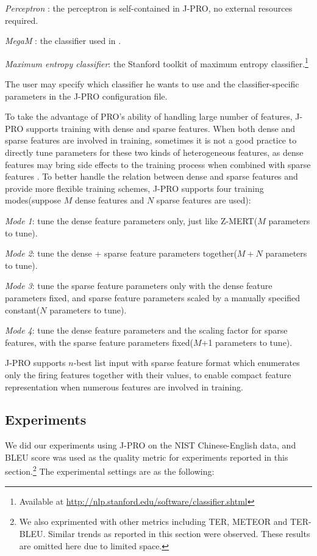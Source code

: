 \documentclass[11pt]{article}
\begin{document}
 \emph{Perceptron} \cite{Rosenblatt1958}: the perceptron is self-contained in J-PRO, no external resources required.

 \emph{MegaM} \cite{Hal2004}: the classifier used in \cite{Hopkins2011}.

 \emph{Maximum entropy classifier}: the Stanford toolkit of maximum entropy classifier.\footnote{Available at \url{http://nlp.stanford.edu/software/classifier.shtml}}
  
The user may specify which classifier he wants to use and the classifier-specific parameters in the J-PRO configuration file.

To take the advantage of PRO's ability of handling large number of features, J-PRO supports training with dense and sparse features. When both dense and sparse features are involved in training, sometimes it is not a good practice to directly tune parameters for these two kinds of heterogeneous features, as dense features may bring side effects to the training process when combined with sparse features \cite{Kristy2008}. To better handle the relation between dense and sparse features and provide more flexible training schemes, J-PRO supports four training modes(suppose $M$ dense features and $N$ sparse features are used):

\emph{Mode 1}: tune the dense feature parameters only, just like Z-MERT($M$ parameters to tune).

\emph{Mode 2}: tune the dense + sparse feature parameters together($M+N$ parameters to tune).

\emph{Mode 3}: tune the sparse feature parameters only with the dense feature parameters fixed, and sparse feature parameters scaled by a manually specified constant($N$ parameters to tune).

\emph{Mode 4}: tune the dense feature parameters and the scaling factor for sparse features, with the sparse feature parameters fixed($M$+1 parameters to tune).

J-PRO supports $n$-best list input with sparse feature format which enumerates only the firing features together with their values, to enable compact feature representation when numerous features are involved in training.

\subsection{Experiments}
We did our experiments using J-PRO on the NIST Chinese-English data, and BLEU score was used as the quality metric for experiments reported in this section.\footnote{We also exprimented with other metrics including TER, METEOR and TER-BLEU. Similar trends as reported in this section were observed. These results are omitted here due to limited space.} The experimental settings are as the following:
\end{document}
